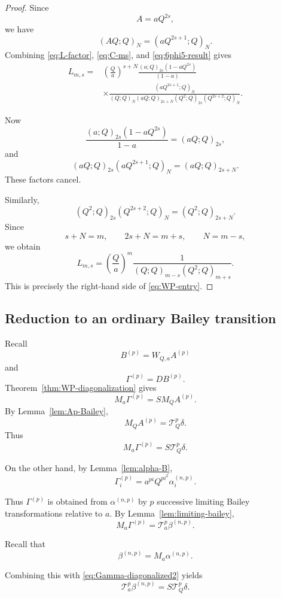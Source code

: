 \documentclass[11pt]{amsart}
\begin{document}
\begin{proof}
Since
\[
A=aQ^{2s},
\]
we have
\[
(AQ;Q)_N
=
(aQ^{2s+1};Q)_N.
\]
Combining
\eqref{eq:L-factor},
\eqref{eq:C-ms}, and
\eqref{eq:6phi5-result} gives
\begin{align*}
L_{m,s}
={}&
\left(\frac Qa\right)^{s+N}
\frac{
(a;Q)_{2s}(1-aQ^{2s})
}{
(1-a)
}
\\
&\times
\frac{
(aQ^{2s+1};Q)_N
}{
(Q;Q)_N
(aQ;Q)_{2s+N}
(Q^2;Q)_{2s}
(Q^{2s+2};Q)_N
}.
\end{align*}

Now
\[
\frac{
(a;Q)_{2s}(1-aQ^{2s})
}{
1-a
}
=
(aQ;Q)_{2s},
\]
and
\[
(aQ;Q)_{2s}
(aQ^{2s+1};Q)_N
=
(aQ;Q)_{2s+N}.
\]
These factors cancel.

Similarly,
\[
(Q^2;Q)_{2s}
(Q^{2s+2};Q)_N
=
(Q^2;Q)_{2s+N}.
\]
Since
\[
s+N=m,
\qquad
2s+N=m+s,
\qquad
N=m-s,
\]
we obtain
\[
L_{m,s}
=
\left(\frac Qa\right)^m
\frac{1}{
(Q;Q)_{m-s}
(Q^2;Q)_{m+s}
}.
\]
This is precisely the right-hand side of
\eqref{eq:WP-entry}.
\end{proof}

\subsection{Reduction to an ordinary Bailey transition}
\label{sec:transition}


Recall
\[
B^{(p)}=W_{Q,a}A^{(p)}
\]
and
\[
\Gamma^{(p)}=DB^{(p)}.
\]
Theorem~\ref{thm:WP-diagonalization} gives
\begin{equation}\label{eq:Gamma-diagonalized}
M_a\Gamma^{(p)}
=
SM_QA^{(p)}.
\end{equation}
By Lemma~\ref{lem:Ap-Bailey},
\[
M_QA^{(p)}
=
\mathcal T_Q^p\delta.
\]
Thus
\begin{equation}\label{eq:Gamma-diagonalized2}
M_a\Gamma^{(p)}
=
S\mathcal T_Q^p\delta.
\end{equation}

On the other hand, by Lemma~\ref{lem:alpha-B},
\[
\Gamma_i^{(p)}
=
a^{pi}Q^{pi^2}
\alpha_i^{(n,p)}.
\]

Thus \(\Gamma^{(p)}\) is obtained from
\(\alpha^{(n,p)}\) by \(p\) successive limiting Bailey transformations
relative to \(a\).  
By Lemma~\ref{lem:limiting-bailey},
\[
M_a\Gamma^{(p)}
=
\mathcal T_a^p\beta^{(n,p)}.
\]


Recall that
\[
\beta^{(n,p)}
=
M_a\alpha^{(n,p)}.
\]

Combining this with \eqref{eq:Gamma-diagonalized2} yields
\begin{equation}\label{eq:T-a-p-beta}
\mathcal T_a^p\beta^{(n,p)}
=
S\mathcal T_Q^p\delta.
\end{equation}
\end{document}
